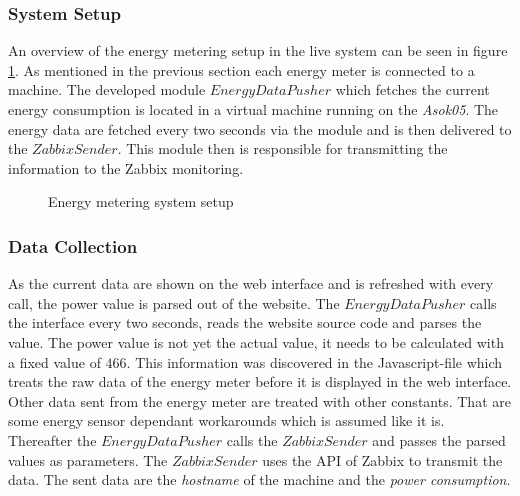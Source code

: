\subsubsection{System Setup}
An overview of the energy metering setup in the live system can be seen in figure \ref{fig:energyMeteringSetup}. As mentioned in the previous section  each energy meter is connected to a machine. The developed module $ EnergyDataPusher $ which fetches the current energy consumption is located in a virtual machine running on the \textit{Asok05}. The energy data are fetched every two seconds via the module and is then delivered to the $ ZabbixSender $. This module then is responsible for transmitting the information to the Zabbix monitoring.

\begin{figure}
	\centering
	\def\svgwidth{\columnwidth}
	
	\caption{Energy metering system setup}
	\label{fig:energyMeteringSetup}
\end{figure}

\subsubsection{Data Collection}
As the current data are shown on the web interface and is refreshed with every call, the power value is parsed out of the website. The $ EnergyDataPusher $ calls the interface every two seconds, reads the website source code and parses the value. The power value is not yet the actual value, it needs to be calculated with a fixed value of $ 466 $. This information was discovered in the Javascript-file which treats the raw data of the energy meter before it is displayed in the web interface. Other data sent from the energy meter are treated with other constants. That are some energy sensor dependant workarounds which is assumed like it is. Thereafter the $ EnergyDataPusher $ calls the $ ZabbixSender $ and passes the parsed values as parameters. The $ ZabbixSender $ uses the API of Zabbix to transmit the data. The sent data are the \textit{hostname} of the machine and the \textit{power consumption}.

